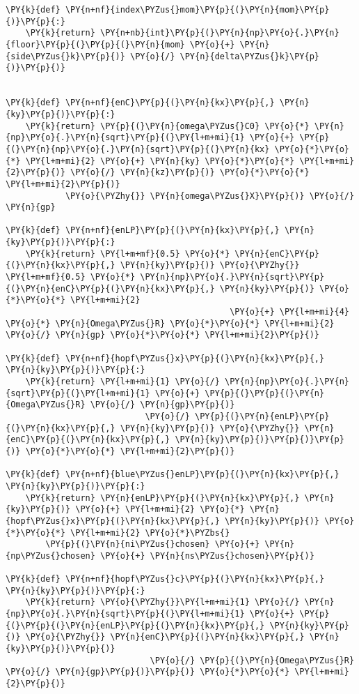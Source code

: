 \begin{Verbatim}[commandchars=\\\{\}]
\PY{k}{def} \PY{n+nf}{index\PYZus{}mom}\PY{p}{(}\PY{n}{mom}\PY{p}{)}\PY{p}{:}
    \PY{k}{return} \PY{n+nb}{int}\PY{p}{(}\PY{n}{np}\PY{o}{.}\PY{n}{floor}\PY{p}{(}\PY{p}{(}\PY{n}{mom} \PY{o}{+} \PY{n}{side\PYZus{}k}\PY{p}{)} \PY{o}{/} \PY{n}{delta\PYZus{}k}\PY{p}{)}\PY{p}{)}


\PY{k}{def} \PY{n+nf}{enC}\PY{p}{(}\PY{n}{kx}\PY{p}{,} \PY{n}{ky}\PY{p}{)}\PY{p}{:}
    \PY{k}{return} \PY{p}{(}\PY{n}{omega\PYZus{}C0} \PY{o}{*} \PY{n}{np}\PY{o}{.}\PY{n}{sqrt}\PY{p}{(}\PY{l+m+mi}{1} \PY{o}{+} \PY{p}{(}\PY{n}{np}\PY{o}{.}\PY{n}{sqrt}\PY{p}{(}\PY{n}{kx} \PY{o}{*}\PY{o}{*} \PY{l+m+mi}{2} \PY{o}{+} \PY{n}{ky} \PY{o}{*}\PY{o}{*} \PY{l+m+mi}{2}\PY{p}{)} \PY{o}{/} \PY{n}{kz}\PY{p}{)} \PY{o}{*}\PY{o}{*} \PY{l+m+mi}{2}\PY{p}{)}
            \PY{o}{\PYZhy{}} \PY{n}{omega\PYZus{}X}\PY{p}{)} \PY{o}{/} \PY{n}{gp}

\PY{k}{def} \PY{n+nf}{enLP}\PY{p}{(}\PY{n}{kx}\PY{p}{,} \PY{n}{ky}\PY{p}{)}\PY{p}{:}
    \PY{k}{return} \PY{l+m+mf}{0.5} \PY{o}{*} \PY{n}{enC}\PY{p}{(}\PY{n}{kx}\PY{p}{,} \PY{n}{ky}\PY{p}{)} \PY{o}{\PYZhy{}} \PY{l+m+mf}{0.5} \PY{o}{*} \PY{n}{np}\PY{o}{.}\PY{n}{sqrt}\PY{p}{(}\PY{n}{enC}\PY{p}{(}\PY{n}{kx}\PY{p}{,} \PY{n}{ky}\PY{p}{)} \PY{o}{*}\PY{o}{*} \PY{l+m+mi}{2}
                                             \PY{o}{+} \PY{l+m+mi}{4} \PY{o}{*} \PY{n}{Omega\PYZus{}R} \PY{o}{*}\PY{o}{*} \PY{l+m+mi}{2} \PY{o}{/} \PY{n}{gp} \PY{o}{*}\PY{o}{*} \PY{l+m+mi}{2}\PY{p}{)}

\PY{k}{def} \PY{n+nf}{hopf\PYZus{}x}\PY{p}{(}\PY{n}{kx}\PY{p}{,} \PY{n}{ky}\PY{p}{)}\PY{p}{:}
    \PY{k}{return} \PY{l+m+mi}{1} \PY{o}{/} \PY{n}{np}\PY{o}{.}\PY{n}{sqrt}\PY{p}{(}\PY{l+m+mi}{1} \PY{o}{+} \PY{p}{(}\PY{p}{(}\PY{n}{Omega\PYZus{}R} \PY{o}{/} \PY{n}{gp}\PY{p}{)}
                            \PY{o}{/} \PY{p}{(}\PY{n}{enLP}\PY{p}{(}\PY{n}{kx}\PY{p}{,} \PY{n}{ky}\PY{p}{)} \PY{o}{\PYZhy{}} \PY{n}{enC}\PY{p}{(}\PY{n}{kx}\PY{p}{,} \PY{n}{ky}\PY{p}{)}\PY{p}{)}\PY{p}{)} \PY{o}{*}\PY{o}{*} \PY{l+m+mi}{2}\PY{p}{)}

\PY{k}{def} \PY{n+nf}{blue\PYZus{}enLP}\PY{p}{(}\PY{n}{kx}\PY{p}{,} \PY{n}{ky}\PY{p}{)}\PY{p}{:}
    \PY{k}{return} \PY{n}{enLP}\PY{p}{(}\PY{n}{kx}\PY{p}{,} \PY{n}{ky}\PY{p}{)} \PY{o}{+} \PY{l+m+mi}{2} \PY{o}{*} \PY{n}{hopf\PYZus{}x}\PY{p}{(}\PY{n}{kx}\PY{p}{,} \PY{n}{ky}\PY{p}{)} \PY{o}{*}\PY{o}{*} \PY{l+m+mi}{2} \PY{o}{*}\PYZbs{}
        \PY{p}{(}\PY{n}{ni\PYZus{}chosen} \PY{o}{+} \PY{n}{np\PYZus{}chosen} \PY{o}{+} \PY{n}{ns\PYZus{}chosen}\PY{p}{)}

\PY{k}{def} \PY{n+nf}{hopf\PYZus{}c}\PY{p}{(}\PY{n}{kx}\PY{p}{,} \PY{n}{ky}\PY{p}{)}\PY{p}{:}
    \PY{k}{return} \PY{o}{\PYZhy{}}\PY{l+m+mi}{1} \PY{o}{/} \PY{n}{np}\PY{o}{.}\PY{n}{sqrt}\PY{p}{(}\PY{l+m+mi}{1} \PY{o}{+} \PY{p}{(}\PY{p}{(}\PY{n}{enLP}\PY{p}{(}\PY{n}{kx}\PY{p}{,} \PY{n}{ky}\PY{p}{)} \PY{o}{\PYZhy{}} \PY{n}{enC}\PY{p}{(}\PY{n}{kx}\PY{p}{,} \PY{n}{ky}\PY{p}{)}\PY{p}{)}
                             \PY{o}{/} \PY{p}{(}\PY{n}{Omega\PYZus{}R} \PY{o}{/} \PY{n}{gp}\PY{p}{)}\PY{p}{)} \PY{o}{*}\PY{o}{*} \PY{l+m+mi}{2}\PY{p}{)}



\end{Verbatim}
